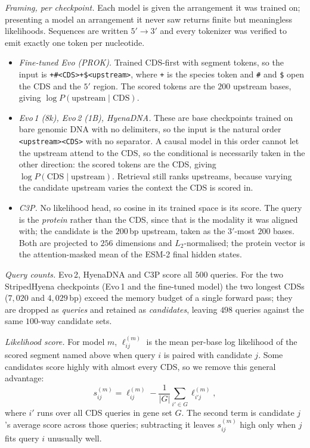 \documentclass{article}
\newcommand{\rev}[1]{\begingroup\color{red}#1\endgroup}
\begin{document}
\rev{\emph{Framing, per checkpoint.} Each model is given the arrangement it was
trained on; presenting a model an arrangement it never saw returns finite but
meaningless likelihoods. Sequences are written $5'\!\to\!3'$ and every tokenizer
was verified to emit exactly one token per nucleotide.
\begin{itemize}\itemsep1pt
  \item \emph{Fine-tuned Evo (PROK).} Trained CDS-first with segment tokens, so
  the input is \texttt{+\#<CDS>+\$<upstream>}, where \texttt{+} is the species
  token and \texttt{\#} and \texttt{\$} open the CDS and the $5'$ region. The
  scored tokens are the $200$ upstream bases, giving
  $\log P(\text{upstream}\mid\text{CDS})$.
  \item \emph{Evo\,1 (8k), Evo\,2 (1B), HyenaDNA.} These are base checkpoints
  trained on bare genomic DNA with no delimiters, so the input is the natural
  order \texttt{<upstream><CDS>} with no separator. A causal model in this order
  cannot let the upstream attend to the CDS, so the conditional is necessarily
  taken in the other direction: the scored tokens are the CDS, giving
  $\log P(\text{CDS}\mid\text{upstream})$. Retrieval still ranks upstreams,
  because varying the candidate upstream varies the context the CDS is scored in.
  \item \emph{C3P.} No likelihood head, so cosine in its trained space is its
  score. The query is the \emph{protein} rather than the CDS, since that is the
  modality it was aligned with; the candidate is the $200$\,bp upstream, taken as
  the $3'$-most $200$ bases. Both are projected to $256$ dimensions and
  $L_2$-normalised; the protein vector is the attention-masked mean of the
  ESM-2 final hidden states.
\end{itemize}
\emph{Query counts.} Evo\,2, HyenaDNA and C3P score all $500$ queries. For the
two StripedHyena checkpoints (Evo\,1 and the fine-tuned model) the two longest
CDSs ($7{,}020$ and $4{,}029$\,bp) exceed the memory budget of a single forward
pass; they are dropped as \emph{queries} and retained as \emph{candidates},
leaving $498$ queries against the same $100$-way candidate sets.}

\emph{Likelihood score.} For model $m$, $\ell^{(m)}_{ij}$ is the mean per-base
log likelihood of the scored segment \rev{named above} when query $i$ is paired
with candidate $j$. Some candidates score highly with almost every CDS,
so we remove this general advantage:
\begin{equation}
s^{(m)}_{ij}=\ell^{(m)}_{ij}-\frac{1}{|G|}\sum_{i'\in G}\ell^{(m)}_{i'j},
\label{eq:retrieval}
\end{equation}
where $i'$ runs over all CDS queries in gene set $G$. The second term is candidate
$j$'s average score across those queries; subtracting it leaves $s^{(m)}_{ij}$ high
only when $j$ fits query $i$ unusually well.
\end{document}
